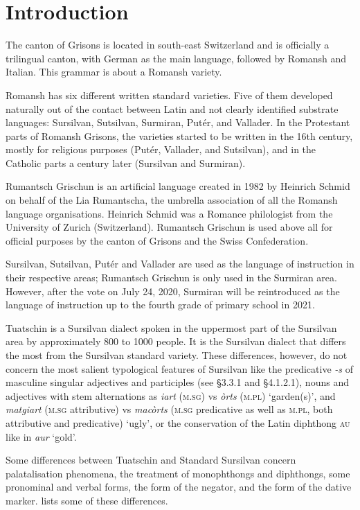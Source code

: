 \chapter{Introduction}
The canton of Grisons is located in south-east Switzerland and is officially a trilingual canton, with German as the main language, followed by Romansh and Italian. This grammar is about a Romansh variety.

Romansh has six different written standard varieties. Five of them developed naturally out of the contact between Latin and not clearly identified substrate languages: Sursilvan, Sutsilvan, Surmiran, Putér, and Vallader. In the Protestant parts of Romansh Grisons, the varieties started to be written in the 16th century, mostly for religious purposes (Putér, Vallader, and Sutsilvan), and in the Catholic parts a century later (Sursilvan and Surmiran). 

Rumantsch Grischun is an artificial language created in 1982 by Heinrich Schmid on behalf of the Lia Rumantscha, the umbrella association of all the Romansh language organisations. Heinrich Schmid was a Romance philologist from the University of Zurich (Switzerland). Rumantsch Grischun is used above all for official purposes by the canton of Grisons and the Swiss Confederation.

Sursilvan, Sutsilvan, Putér and Vallader are used as the language of instruction in their respective areas; Rumantsch Grischun is only used in the Surmiran area. However, after the vote on July 24, 2020, Surmiran will be reintroduced as the language of instruction up to the fourth grade of primary school in 2021. 

Tuatschin is a Sursilvan dialect spoken in the uppermost part of the Sursilvan area by approximately 800 to 1000 people. It is the Sursilvan dialect that differs the most from the Sursilvan standard variety. These differences, however, do not concern the most salient typological features of Sursilvan like the predicative \textit{-s} of masculine singular adjectives and participles (see §3.3.1 and §4.1.2.1), nouns and adjectives with stem alternations as \textit{iart} (\textsc{m.sg}) vs \textit{òrts} \textsc{(m.pl}) `garden(s)', and \textit{matgiart} (\textsc{m.sg} attributive) vs \textit{macòrts} \textsc{(m.sg} predicative as well as \textsc{m.pl}, both attributive and predicative) `ugly', or the conservation of the Latin diphthong \textsc{au} like in \textit{aur} `gold'.

Some differences between Tuatschin and Standard Sursilvan concern palatalisation phenomena, the treatment of monophthongs and diphthongs, some pronominal and verbal forms, the form of the negator, and the form of the dative marker.  lists some of these differences.

